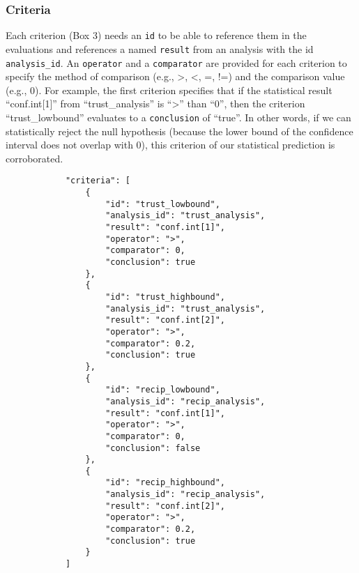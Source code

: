 \documentclass[english,doc,floatsintext]{apa6}
\begin{document}
\hypertarget{criteria}{%
\subsubsection{Criteria}\label{criteria}}

Each criterion (Box 3) needs an \texttt{id} to be able to reference them in the evaluations and references a named \texttt{result} from an analysis with the id \texttt{analysis\_id}. An \texttt{operator} and a \texttt{comparator} are provided for each criterion to specify the method of comparison (e.g., \textgreater{}, \textless{}, =, !=) and the comparison value (e.g., 0). For example, the first criterion specifies that if the statistical result \enquote{conf.int{[}1{]}} from \enquote{trust\_analysis} is \enquote{\textgreater{}} than \enquote{0}, then the criterion \enquote{trust\_lowbound} evaluates to a \texttt{conclusion} of \enquote{true}. In other words, if we can statistically reject the null hypothesis (because the lower bound of the confidence interval does not overlap with 0), this criterion of our statistical prediction is corroborated.

\begin{tcolorbox}[colback=black!5!white,colframe=white!5!black,title=Box 3. Criteria for evaluation.]
\begin{verbatim}
            "criteria": [
                {
                    "id": "trust_lowbound",
                    "analysis_id": "trust_analysis",
                    "result": "conf.int[1]",
                    "operator": ">",
                    "comparator": 0,
                    "conclusion": true
                },
                {
                    "id": "trust_highbound",
                    "analysis_id": "trust_analysis",
                    "result": "conf.int[2]",
                    "operator": ">",
                    "comparator": 0.2,
                    "conclusion": true
                },
                {
                    "id": "recip_lowbound",
                    "analysis_id": "recip_analysis",
                    "result": "conf.int[1]",
                    "operator": ">",
                    "comparator": 0,
                    "conclusion": false
                },
                {
                    "id": "recip_highbound",
                    "analysis_id": "recip_analysis",
                    "result": "conf.int[2]",
                    "operator": ">",
                    "comparator": 0.2,
                    "conclusion": true
                }
            ]
\end{verbatim}
\end{tcolorbox}
\end{document}
